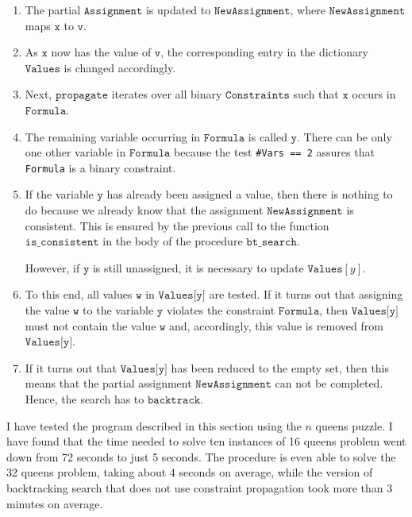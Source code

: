 \begin{enumerate}
\item The partial $\texttt{Assignment}$ is updated to $\texttt{NewAssignment}$, where $\texttt{NewAssignment}$
      maps $\texttt{x}$ to $\texttt{v}$.
\item As $\texttt{x}$ now has the value of $\texttt{v}$, the corresponding entry in the dictionary
      $\texttt{Values}$ is changed accordingly. 
\item Next, $\texttt{propagate}$ iterates over all binary $\texttt{Constraints}$ such that $\texttt{x}$ occurs in 
      $\texttt{Formula}$.
\item The remaining variable occurring in $\texttt{Formula}$ is called $\texttt{y}$.  There can be only one other
      variable in $\texttt{Formula}$ because the test \texttt{\#Vars == 2} assures that \texttt{Formula}
      is a binary constraint.
\item If the variable $\texttt{y}$ has already been assigned a value, then there is nothing to do because
      we already know that the assignment $\texttt{NewAssignment}$ is consistent.  This is ensured by the
      previous call to the function $\texttt{is\_consistent}$ in the body of the procedure $\texttt{bt\_search}$.

      However, if $\texttt{y}$ is still unassigned, it is necessary to update $\texttt{Values}[y]$.
\item To this end, all values $\texttt{w}$ in $\texttt{Values[y]}$ are tested.  
      If it turns out that assigning the value $\texttt{w}$ to the variable $\texttt{y}$ violates the
      constraint $\texttt{Formula}$, then $\texttt{Values[y]}$ must not contain the value $\texttt{w}$ 
      and, accordingly, this value is removed from $\texttt{Values[y]}$.
\item If it turns out that $\texttt{Values[y]}$ has been reduced to the empty set, then this means that the
      partial assignment $\texttt{NewAssignment}$ can not be completed.  Hence, the search has to
      $\texttt{backtrack}$.
\end{enumerate}
I have tested the program described in this section using the $n$ queens puzzle. 
I have found that the time needed to solve ten
instances of 16 queens problem went down from 72 seconds to just 5 seconds.  The procedure is even able to
solve the 32 queens problem, taking about 4 seconds on average, while the version of backtracking search that
does not use constraint propagation took more than 3 minutes on average.

